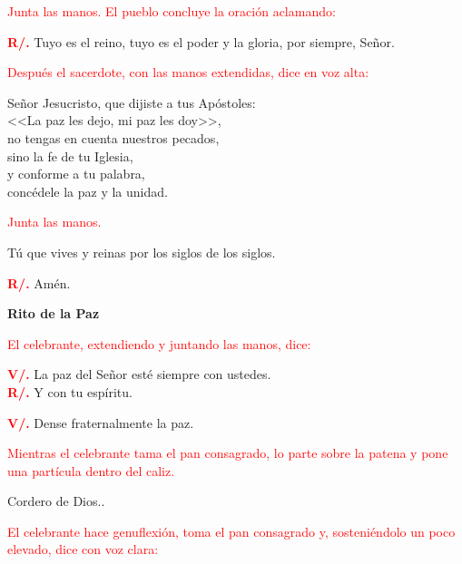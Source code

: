 \documentclass[12pt, letterpaper]{report}
\begin{document}
	\large{\textcolor{red}{Junta las manos. El pueblo concluye la oraci\'on aclamando:}}

	\noindent
	\Large {\bfseries \textcolor{red}{R/.}} \hspace{0.5cm} Tuyo es el reino, tuyo es el poder y la gloria, por siempre, Se\~nor.

	\large{\textcolor{red}{Despu\'es el sacerdote, con las manos extendidas, dice en voz alta:}}

	\noindent
	\Large Se\~nor Jesucristo, que dijiste a tus Ap\'ostoles:\\
	<<La paz les dejo, mi paz les doy>>,\\
	no tengas en cuenta nuestros pecados,\\
	sino la fe de tu Iglesia,\\
	y conforme a tu palabra,\\
	conc\'edele la paz y la unidad.

	\large{\textcolor{red}{Junta las manos.}}

	\Large T\'u que vives y reinas por los siglos de los siglos.

	\noindent
	\Large {\bfseries \textcolor{red}{R/.}} \hspace{0.5cm} Am\'en.

	\begin{center}
	\Huge {\bfseries Rito de la Paz}
	\end{center}

	\large {\textcolor{red}{El celebrante, extendiendo y juntando las manos, dice:}}

	\noindent
	\Large {\bfseries \textcolor{red}{V/.}} \hspace{0.5cm} La paz del Se\~nor est\'e siempre con ustedes.\\
	\Large {\bfseries \textcolor{red}{R/.}} \hspace{0.5cm} Y con tu esp\'iritu.

	\noindent
	\Large {\bfseries \textcolor{red}{V/.}} \hspace{0.5cm} Dense fraternalmente la paz.

	\newpage

	\large{\textcolor{red}{Mientras el celebrante tama el pan consagrado, lo parte sobre la patena y pone una part\'icula dentro del caliz.}}

	\Large Cordero de Dios..

	\large{\textcolor{red}{El celebrante hace genuflexi\'on, toma el pan consagrado y, sosteni\'endolo un poco elevado, dice con voz clara:}}
\end{document}
